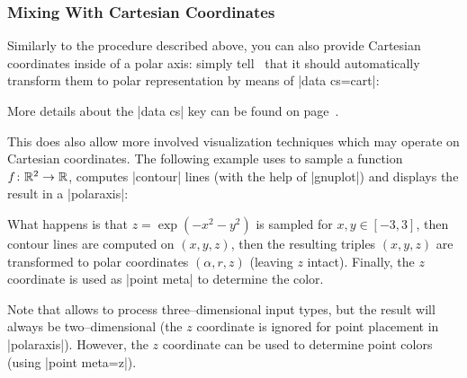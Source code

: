 {\subsubsection{Mixing With Cartesian Coordinates}
\label{sec:polar:cart}
Similarly to the procedure described above, you can also provide Cartesian coordinates inside of a polar axis: simply tell \PGFPlots\ that it should automatically transform them to polar representation by means of |data cs=cart|:
\begin{codeexample}[]
\end{codeexample}
\noindent More details about the |data cs| key can be found on page~\pageref{key:data:cs}.

This does also allow more involved visualization techniques which may operate on Cartesian coordinates. The following example uses  to sample a function $f\colon \mathbb{R}^2 \to \mathbb{R}$, computes |contour| lines (with the help of |gnuplot|) and displays the result in a |polaraxis|:
\pgfplotsexpensiveexample
\begin{codeexample}[]
\end{codeexample}
\noindent What happens is that $z=\exp(-x^2-y^2)$ is sampled for $x,y \in [-3,3]$, then contour lines are computed on $(x,y,z)$, then the resulting triples $(x,y,z)$ are transformed to polar coordinates $(\alpha,r,z)$ (leaving $z$ intact). Finally, the $z$ coordinate is used as |point meta| to determine the color.

Note that  allows to process three--dimensional input types, but the result will always be two--dimensional (the $z$ coordinate is ignored for point placement in |polaraxis|). However, the $z$ coordinate can be used to determine point colors (using |point meta=z|).

}
